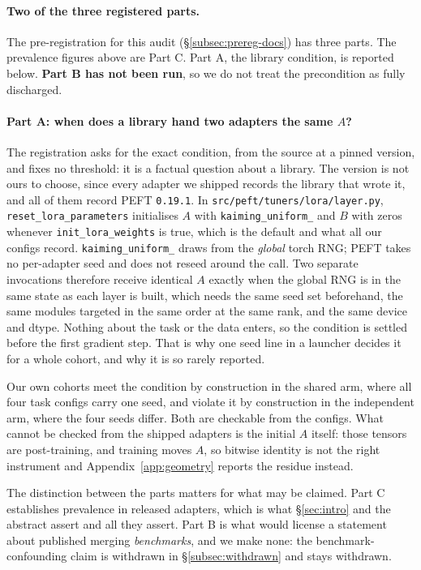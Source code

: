 \paragraph{Two of the three registered parts.} The
pre-registration for this audit (\S\ref{subsec:prereg-docs}) has three parts.
The prevalence figures above are Part C. Part A, the library condition, is
reported below. \textbf{Part B has not been run}, so we do not treat the
precondition as fully discharged.

\paragraph{Part A: when does a library hand two adapters the same $A$?} The
registration asks for the exact condition, from the source at a pinned
version, and fixes no threshold: it is a factual question about a library. The
version is not ours to choose, since every adapter we shipped records the
library that wrote it, and all of them record PEFT \texttt{0.19.1}. In
\texttt{src/peft/tuners/lora/layer.py}, \texttt{reset\_lora\_parameters}
initialises $A$ with \texttt{kaiming\_uniform\_} and $B$ with zeros whenever
\texttt{init\_lora\_weights} is true, which is the default and what all our
configs record. \texttt{kaiming\_uniform\_} draws from the \emph{global} torch
RNG; PEFT takes no per-adapter seed and does not reseed around the call. Two
separate invocations therefore receive identical $A$ exactly when the global
RNG is in the same state as each layer is built, which needs the same seed set
beforehand, the same modules targeted in the same order at the same rank, and
the same device and dtype. Nothing about the task or the data enters, so the
condition is settled before the first gradient step. That is why one seed line
in a launcher decides it for a whole cohort, and why it is so rarely reported.

Our own cohorts meet the condition by construction in the shared arm, where
all four task configs carry one seed, and violate it by construction in the
independent arm, where the four seeds differ. Both are checkable from the
configs. What cannot be checked from the shipped adapters is the initial $A$
itself: those tensors are post-training, and training moves $A$, so bitwise
identity is not the right instrument and Appendix~\ref{app:geometry} reports
the residue instead.

The distinction between the parts matters for what may be claimed. Part C
establishes prevalence in released adapters, which is what \S\ref{sec:intro}
and the abstract assert and all they assert. Part B is what would license a
statement about published merging \emph{benchmarks}, and we make none: the
benchmark-confounding claim is withdrawn in \S\ref{subsec:withdrawn} and stays
withdrawn.

